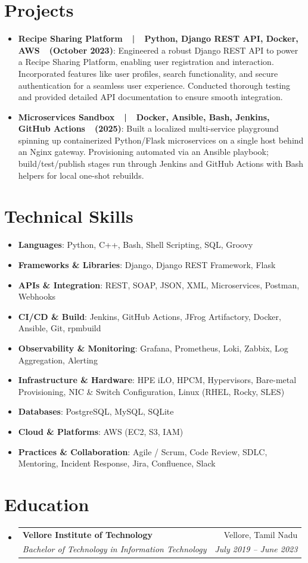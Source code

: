 \documentclass[a4paper,11pt]{article}
\makeatletter
\newcommand{\resumeItem}[2]{
  \item\small{
    \textbf{#1}{: #2 \vspace{-2pt}}
  }
}
\newcommand{\resumeSubheading}[4]{
  \vspace{-1pt}\item
    \begin{tabular*}{0.97\textwidth}{l@{\extracolsep{\fill}}r}
      \textbf{#1} & #2 \\
      \textit{#3} & \textit{#4} \\
    \end{tabular*}\vspace{-5pt}
}
\newcommand{\resumeSubItem}[2]{\resumeItem{#1}{#2}\vspace{-3pt}}
\newcommand{\resumeSubHeadingListStart}{\begin{itemize}[leftmargin=*]}
\newcommand{\resumeSubHeadingListEnd}{\end{itemize}}
\makeatother
\begin{document}
\section{Projects}
\resumeSubHeadingListStart
  \resumeSubItem{Recipe Sharing Platform~~|~~Python, Django REST API, Docker, AWS~~(October 2023)}
    {Engineered a robust Django REST API to power a Recipe Sharing Platform, enabling user registration and interaction. Incorporated features like user profiles, search functionality, and secure authentication for a seamless user experience. Conducted thorough testing and provided detailed API documentation to ensure smooth integration.}
  \resumeSubItem{Microservices Sandbox~~|~~Docker, Ansible, Bash, Jenkins, GitHub Actions~~(2025)}
    {Built a localized multi-service playground spinning up containerized Python/Flask microservices on a single host behind an Nginx gateway. Provisioning automated via an Ansible playbook; build/test/publish stages run through Jenkins and GitHub Actions with Bash helpers for local one-shot rebuilds.}
\resumeSubHeadingListEnd

\section{Technical Skills}
\resumeSubHeadingListStart
  \resumeSubItem{Languages}{Python, C++, Bash, Shell Scripting, SQL, Groovy}
  \resumeSubItem{Frameworks \& Libraries}{Django, Django REST Framework, Flask}
  \resumeSubItem{APIs \& Integration}{REST, SOAP, JSON, XML, Microservices, Postman, Webhooks}
  \resumeSubItem{CI/CD \& Build}{Jenkins, GitHub Actions, JFrog Artifactory, Docker, Ansible, Git, rpmbuild}
  \resumeSubItem{Observability \& Monitoring}{Grafana, Prometheus, Loki, Zabbix, Log Aggregation, Alerting}
  \resumeSubItem{Infrastructure \& Hardware}{HPE iLO, HPCM, Hypervisors, Bare-metal Provisioning, NIC \& Switch Configuration, Linux (RHEL, Rocky, SLES)}
  \resumeSubItem{Databases}{PostgreSQL, MySQL, SQLite}
  \resumeSubItem{Cloud \& Platforms}{AWS (EC2, S3, IAM)}
  \resumeSubItem{Practices \& Collaboration}{Agile / Scrum, Code Review, SDLC, Mentoring, Incident Response, Jira, Confluence, Slack}
\resumeSubHeadingListEnd

\section{Education}
  \resumeSubHeadingListStart
    \resumeSubheading
      {Vellore Institute of Technology}{Vellore, Tamil Nadu}
      {Bachelor of Technology in Information Technology}{July 2019 -- June 2023}
  \resumeSubHeadingListEnd
\end{document}
